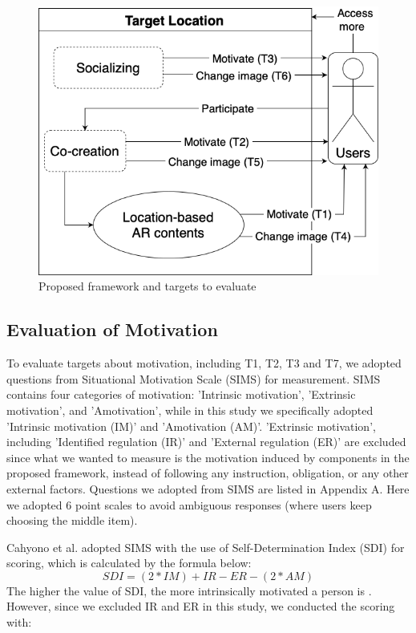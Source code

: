 \begin{figure}[ht]
  \centering
  \includegraphics[width=0.8\columnwidth]{resources/5_experiment_and_results/proposed_framework_with_evaluation_targets.png}
    \caption{Proposed framework and targets to evaluate}
\end{figure}

\subsection{Evaluation of Motivation}

To evaluate targets about motivation, including T1, T2, T3 and T7, we adopted questions from Situational Motivation Scale (SIMS) \cite{guay_vallerand_blanchard_2000} for measurement.
SIMS contains four categories of motivation: 'Intrinsic motivation', 'Extrinsic motivation', and 'Amotivation', while in this study we specifically adopted 'Intrinsic motivation (IM)' and 'Amotivation (AM)'.
'Extrinsic motivation', including 'Identified regulation (IR)' and 'External regulation (ER)' are excluded since what we wanted to measure is the motivation induced by components in the proposed framework, instead of following any instruction, obligation, or any other external factors.
Questions we adopted from SIMS are listed in Appendix A.
Here we adopted 6 point scales to avoid ambiguous responses (where users keep choosing the middle item).

Cahyono et al. adopted SIMS with the use of Self-Determination Index (SDI) for scoring, which is calculated by the formula below:
\[ SDI = (2 * IM) + IR - ER - (2 * AM) \]
The higher the value of SDI, the more intrinsically motivated a person is \cite{cahyono_ludwig_2017}.
However, since we excluded IR and ER in this study, we conducted the scoring with:

